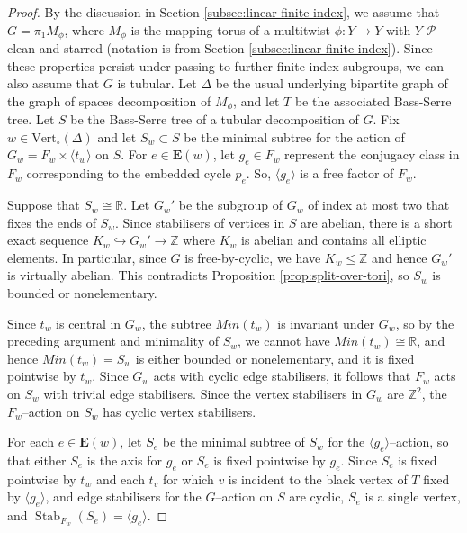 \documentclass[11pt,oneside]{amsart}
\newcounter{ax}
\theoremstyle{definition}
\DeclareMathOperator{\stabilizer}{Stab}
\newcommand{\field}[1]{\mathbb{#1}}
\newcommand{\integers}{\ensuremath{\field{Z}}}
\newcommand{\reals}{\ensuremath{\field{R}}}
\newcommand{\vertices}{\mathrm{Vert}}
\begin{document}
\begin{proof}
By the discussion in Section \ref{subsec:linear-finite-index}, we  assume that $G=\pi_1M_\phi$, where $M_\phi$ is the mapping torus of a multitwist $\phi:Y\to Y$ with $Y$ $\mathcal P$--clean and starred (notation is from Section \ref{subsec:linear-finite-index}). Since these properties persist under passing to further finite-index subgroups, we can also assume that $G$ is tubular.  Let $\Delta$ be the usual underlying bipartite graph of the graph of spaces decomposition of $M_\phi$, and let $T$ be the associated Bass-Serre tree. Let $S$ be the Bass-Serre tree of a tubular decomposition of $G$.  Fix $w\in\vertices_\circ(\Delta)$ and let $S_w\subset S$ be the minimal subtree for the action of $G_w=F_w\times \langle t_w\rangle$ on $S$.  For $e\in\mathbf E(w)$, let $g_e\in F_w$ represent the conjugacy class in $F_w$ corresponding to the embedded cycle $p_e$.  So, $\langle g_e\rangle$ is a free factor of $F_w$.

Suppose that $S_w\cong\reals$.  Let $G_w'$ be the subgroup of $G_w$ of index at most two that fixes the ends of $S_w$.  Since stabilisers of vertices in $S$ are abelian, there is a short exact sequence $K_w\hookrightarrow G_w'\to \integers$
where $K_w$ is abelian and contains all elliptic elements.  In particular, since $G$ is free-by-cyclic, we have $K_w\leq \integers$ and hence $G_w'$ is virtually abelian.  This contradicts Proposition \ref{prop:split-over-tori}, so $S_w$ is bounded or nonelementary.

Since $t_w$ is central in $G_w$, the subtree $Min(t_w)$ is invariant under $G_w$, so by the preceding argument and minimality of $S_w$, we cannot have $Min(t_w)\cong\reals$, and hence $Min(t_w)=S_w$ is either bounded or nonelementary, and it is fixed pointwise by $t_w$.  Since $G_w$ acts with cyclic edge stabilisers, it follows that $F_w$ acts on $S_w$ with trivial edge stabilisers.  Since the vertex stabilisers in $G_w$ are $\integers^2$, the $F_w$--action on $S_w$ has cyclic vertex stabilisers.

For each $e\in\mathbf E(w)$, let $S_e$ be the minimal subtree of $S_w$ for the $\langle g_e\rangle$--action, so that either $S_e$ is the axis for $g_e$ or $S_e$ is fixed pointwise by $g_e$.  Since $S_e$ is fixed pointwise by $t_w$ and each $t_v$ for which $v$ is incident to the black vertex of $T$ fixed by $\langle g_e\rangle$, and edge stabilisers for the $G$--action on $S$ are cyclic, $S_e$ is a single vertex, and $\stabilizer_{F_w}(S_e)=\langle g_e\rangle$.


\end{proof}
\end{document}
